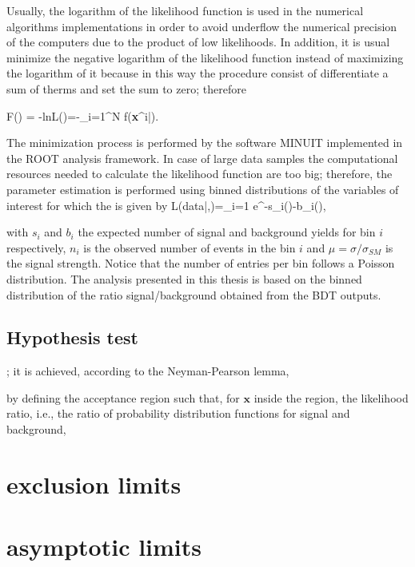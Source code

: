 Usually, the logarithm of the likelihood function is used in the numerical algorithms implementations in order to avoid underflow the numerical precision of the computers due to the product of low likelihoods. In addition, it is usual minimize the negative logarithm of the likelihood function instead of maximizing the logarithm of it because in this way the procedure consist of differentiate a sum of therms and set the sum to zero; therefore

\beqn
F(\bm{\theta}) = -\textrm{ln}L(\bm{\theta})=-\sum_{i=1}^N f(\textbf{x}^i|\bm{\theta}).
\eeqn

The minimization process is performed by the software MINUIT \cite{minuit} implemented in the ROOT analysis framework. In case of large data samples the computational resources needed to calculate the likelihood function are too big; therefore, the parameter estimation is performed using binned distributions of the variables of interest for which the  is given by
\beqn
L(data|\mu,\theta)=\prod_{i=1}  e^{-\mu s_i(\theta)-b_i(\theta)},\label{eqn:bml}
\eeqn

\noindent with $s_i$ and $b_i$ the expected number of signal and background yields for bin $i$ respectively, $n_i$ is the observed number of events in the bin $i$ and $\mu = \sigma/\sigma_{SM}$ is the signal strength. Notice that the number of entries per bin follows a Poisson distribution. The analysis presented in this thesis is based on the binned distribution of the ratio signal/background obtained from the BDT outputs.   


\subsection{Hypothesis test}






; it is achieved, according to the Neyman-Pearson lemma\cite{npl},






by defining the acceptance region such that, for $\textbf{x}$ inside the region, the likelihood ratio, i.e., the ratio of probability distribution functions for signal and background,



\section{exclusion limits }
\section{asymptotic limits }


 









